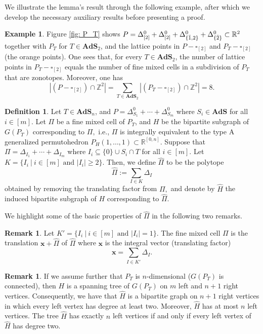 \documentclass[12pt,reqno]{article}%
\theoremstyle{definition}
\newtheorem{defn}[thm]{Definition}
\newtheorem{ex}[thm]{Example}
\newtheorem{rem}[thm]{Remark}
\numberwithin{equation}{section}
\newcommand{\bbx}{\mathbf{x}}
\newcommand{\Z}{\mathbb Z}
\newcommand{\R}{\mathbb R}
\newcommand{\ads}{\mathbf{AdS}}
\newcommand{\sym}{\Delta^0}
\begin{document}
We illustrate the lemma’s result through the following example, after which we develop the necessary auxiliary results before presenting a proof.

\begin{ex}
    Figure \ref{fig: P_T} shows $P = \sym_{[2]} + \sym_{[2]} + \sym_{\{\Bar{1},2\}} + \sym_{\{\Bar{2}\}} \subset \R^2$ together with $P_T$ for $T \in \ads_2$, and the lattice points in $P - \square_{[2]}$ and $P_T - \square_{[2]}$ (the orange points). One sees that, for every $T \in \ads_2$, the number of lattice points in $P_T -\square_{[2]}$ equals the number of fine mixed cells in a subdivision of $P_T$ that are zonotopes. Moreover, one has 
    \[|(P - \square_{[2]})\cap \Z^2| = \sum_{T \in \ads_2}|(P_T - \square_{[2]})\cap \Z^2| = 8.\]
\end{ex}

\begin{defn}\label{def: no-translation-cell} Let $T \in \ads_n$, and $P = \Delta^0_{S_1} + \cdots + \Delta^0_{S_m}$ where $S_i \in \ads$ for all $i \in [m]$. Let $\Pi$ be a fine mixed cell of $P_T$, and $H$ be the bipartite subgraph of $G(P_T)$ corresponding to $\Pi,$ i.e., $\Pi$ is integrally equivalent to the type A generalized permutohedron $P_{{H}}(1,\dots, 1) \subset \R^{[0,n]}.$ Suppose that $\Pi = \Delta_{I_1} + \cdots + \Delta_{I_m}$  where  $I_i \subseteq \{0\}\cup S_i\cap T$ for all $i \in [m]$. Let $K = \{I_i\ | \ i \in [m] \text{ and } |I_i| \geq 2\}$. Then, we define $\hat{\Pi}$ to be the polytope 
    \[\hat{\Pi} := \sum_{I \in K}\Delta_I\]
obtained by removing the translating factor from $\Pi,$ and denote by $\hat{H}$ the induced bipartite subgraph of $H$ corresponding to $\hat{\Pi}.$
\end{defn}

We highlight some of the basic properties of $\hat{\Pi}$ in the following two remarks.

\begin{rem}\label{rem: translation-of-Pi}
    Let $K' = \{I_i \ | \ i \in [m] \text{ and } |I_i| = 1\}$. The fine mixed cell $\Pi$ is the translation $\bbx + \hat{\Pi}$ of $\hat{\Pi}$ where $\bbx$ is the integral vector (translating factor) $$\bbx = \sum_{I \in K'}\Delta_I.$$ 
\end{rem}

\begin{rem}\label{rem: at-most-n-left-vertices}
    If we assume further that $P_T$ is $n$-dimensional ($G(P_T)$ is connected), then $H$ is a spanning tree of $G(P_T)$ on $m$ left and $n+1$ right vertices. Consequently, we have that $\hat{H}$ is a bipartite graph on $n+1$ right vertices in which every left vertex has degree at least two. Moreover, $\hat{H}$ has at most $n$ left vertices. The tree $\hat{H}$ has exactly $n$ left vertices if and only if every left vertex of $\hat{H}$ has degree two.
\end{rem} 
\end{document}
